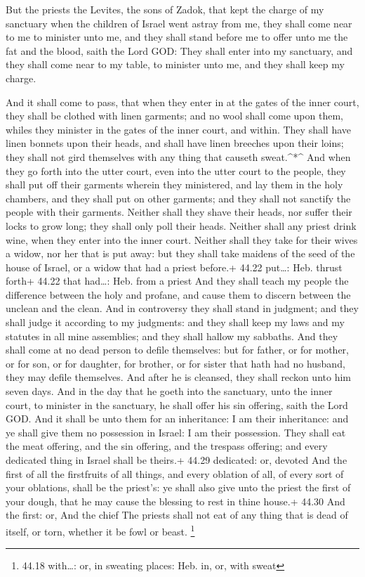  But the priests the Levites, the sons of Zadok, that kept
the charge of my sanctuary when the children of Israel went astray from
me, they shall come near to me to minister unto me, and they shall stand
before me to offer unto me the fat and the blood, saith the Lord GOD:
 They shall enter into my sanctuary, and they shall come
near to my table, to minister unto me, and they shall keep my charge.

 And it shall come to pass, that when they enter in at the
gates of the inner court, they shall be clothed with linen garments; and
no wool shall come upon them, whiles they minister in the gates of the
inner court, and within.  They shall have linen bonnets
upon their heads, and shall have linen breeches upon their loins; they
shall not gird themselves with any thing that causeth sweat.\^{}*\^{}
 And when they go forth into the utter court, even into the
utter court to the people, they shall put off their garments wherein
they ministered, and lay them in the holy chambers, and they shall put
on other garments; and they shall not sanctify the people with their
garments.  Neither shall they shave their heads, nor suffer
their locks to grow long; they shall only poll their heads.
 Neither shall any priest drink wine, when they enter into
the inner court.  Neither shall they take for their wives a
widow, nor her that is put away: but they shall take maidens of the seed
of the house of Israel, or a widow that had a priest before.+ 44.22
put\ldots: Heb. thrust forth+ 44.22 that had\ldots: Heb. from a priest
 And they shall teach my people the difference between the
holy and profane, and cause them to discern between the unclean and the
clean.  And in controversy they shall stand in judgment;
and they shall judge it according to my judgments: and they shall keep
my laws and my statutes in all mine assemblies; and they shall hallow my
sabbaths.  And they shall come at no dead person to defile
themselves: but for father, or for mother, or for son, or for daughter,
for brother, or for sister that hath had no husband, they may defile
themselves.  And after he is cleansed, they shall reckon
unto him seven days.  And in the day that he goeth into the
sanctuary, unto the inner court, to minister in the sanctuary, he shall
offer his sin offering, saith the Lord GOD.  And it shall
be unto them for an inheritance: I am their inheritance: and ye shall
give them no possession in Israel: I am their possession. 
They shall eat the meat offering, and the sin offering, and the trespass
offering; and every dedicated thing in Israel shall be theirs.+ 44.29
dedicated: or, devoted  And the first of all the
firstfruits of all things, and every oblation of all, of every sort of
your oblations, shall be the priest's: ye shall also give unto the
priest the first of your dough, that he may cause the blessing to rest
in thine house.+ 44.30 And the first: or, And the chief 
The priests shall not eat of any thing that is dead of itself, or torn,
whether it be fowl or beast. \footnote{44.18 with\ldots: or, in sweating
  places: Heb. in, or, with sweat}

